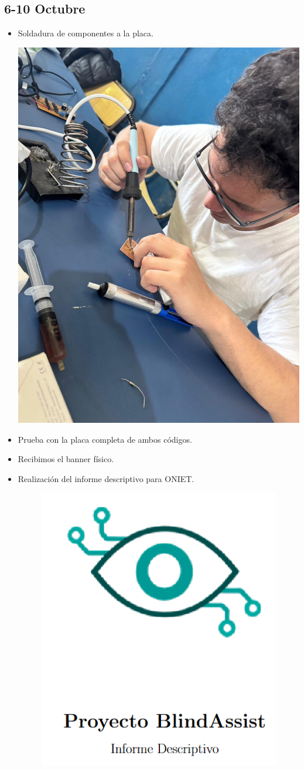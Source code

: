 \documentclass[12pt,a4paper]{article}
\begin{document}
\subsection*{6-10 Octubre}
\begin{itemize}
\item Soldadura de componentes a la placa.

    \includegraphics[width=0.5\linewidth]{Carpeta de campo/soldadura.png}

\item Prueba con la placa completa de ambos códigos.
\item Recibimos el banner físico.
\item Realización del informe descriptivo para ONIET.
\begin{figure}[H]
    \centering
    \includegraphics[width=0.5\linewidth]{Carpeta de campo/informe.png}
\end{figure}

\end{itemize}
\end{document}

